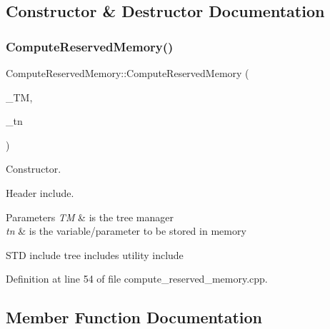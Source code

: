 \subsection{Constructor \& Destructor Documentation}
\mbox{\label{classComputeReservedMemory_a2544d3a9d8e8bb227eef45398fa8f38e}} 
\subsubsection{\texorpdfstring{Compute\+Reserved\+Memory()}{ComputeReservedMemory()}}
{\footnotesize\ttfamily Compute\+Reserved\+Memory\+::\+Compute\+Reserved\+Memory (\begin{DoxyParamCaption}\item[{const \hyperlink{tree__manager_8hpp_a792e3f1f892d7d997a8d8a4a12e39346}{tree\+\_\+manager\+Const\+Ref}}]{\+\_\+\+TM,  }\item[{const \hyperlink{tree__node_8hpp_a3cf5d02292c940f3892425a5b5fdec3c}{tree\+\_\+node\+Const\+Ref}}]{\+\_\+tn }\end{DoxyParamCaption})}



Constructor. 

Header include.


\begin{DoxyParams}{Parameters}
{\em TM} & is the tree manager \\
\hline
{\em tn} & is the variable/parameter to be stored in memory\\
\hline
\end{DoxyParams}
S\+TD include tree includes utility include 

Definition at line 54 of file compute\+\_\+reserved\+\_\+memory.\+cpp.



\subsection{Member Function Documentation}
\mbox{\label{classComputeReservedMemory_a5353a626c8ef1f507c379bec8f5fb36e}} 
